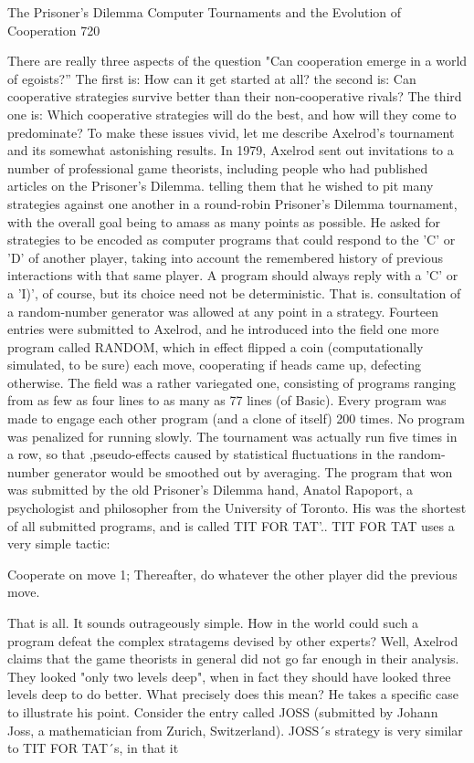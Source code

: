 The Prisoner's Dilemma Computer Tournaments and the Evolution of Cooperation            720

There are really three aspects of the question "Can cooperation emerge in a world of
egoists?'' The first is: How can it get started at all? the second is: Can cooperative
strategies survive better than their non-cooperative rivals? The third one is: Which
cooperative strategies will do the best, and how will they come to predominate?
         To make these issues vivid, let me describe Axelrod's tournament and its
somewhat astonishing results. In 1979, Axelrod sent out invitations to a number of
professional game theorists, including people who had published articles on the Prisoner's
Dilemma. telling them that he wished to pit many strategies against one another in a
round-robin Prisoner's Dilemma tournament, with the overall goal being to amass as
many points as possible. He asked for strategies to be encoded as computer programs that
could respond to the 'C' or 'D' of another player, taking into account the remembered
history of previous interactions with that same player. A program should always reply
with a 'C' or a 'I)', of course, but its choice need not be deterministic. That is. consultation
of a random-number generator was allowed at any point in a strategy.
         Fourteen entries were submitted to Axelrod, and he introduced into the field one
more program called RANDOM, which in effect flipped a coin (computationally
simulated, to be sure) each move, cooperating if heads came up, defecting otherwise. The
field was a rather variegated one, consisting of programs ranging from as few as four
lines to as many as 77 lines (of Basic). Every program was made to engage each other
program (and a clone of itself) 200 times. No program was penalized for running slowly.
The tournament was actually run five times in a row, so that ,pseudo-effects caused by
statistical fluctuations in the random-number generator would be smoothed out by
averaging.
         The program that won was submitted by the old Prisoner's Dilemma hand, Anatol
Rapoport, a psychologist and philosopher from the University of Toronto. His was the
shortest of all submitted programs, and is called TIT FOR TAT'.. TIT FOR TAT uses a
very simple tactic:

       Cooperate on move 1;
       Thereafter, do whatever the other player did the previous move.

         That is all. It sounds outrageously simple. How in the world could such a program
defeat the complex stratagems devised by other experts?
         Well, Axelrod claims that the game theorists in general did not go far enough in
their analysis. They looked "only two levels deep", when in fact they should have looked
three levels deep to do better. What precisely does this mean? He takes a specific case to
illustrate his point. Consider the entry called JOSS (submitted by Johann Joss, a
mathematician from Zurich, Switzerland). JOSS´s strategy is very similar to TIT FOR
TAT´s, in that it




